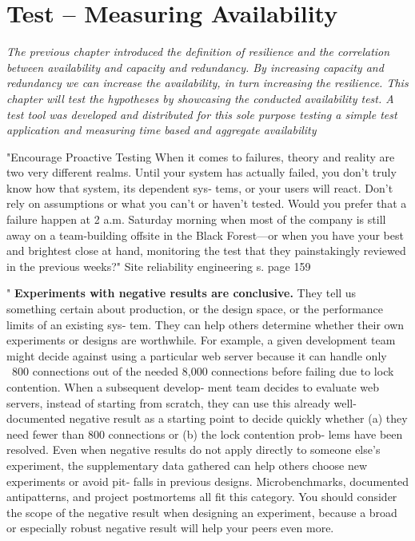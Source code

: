 \chapter{Test -- Measuring Availability}
\label{ch:experiment}

\textit{The previous chapter introduced the definition of resilience and the correlation between availability and capacity and redundancy. By increasing capacity and redundancy we can increase the availability, in turn increasing the resilience. This chapter will test the hypotheses by showcasing the conducted availability test. A test tool was developed and distributed for this sole purpose testing a simple test application and measuring time based and aggregate availability}






"Encourage Proactive Testing
When it comes to failures, theory and reality are two very different realms. Until your system has actually failed, you don’t truly know how that system, its dependent sys‐ tems, or your users will react. Don’t rely on assumptions or what you can’t or haven’t tested. Would you prefer that a failure happen at 2 a.m. Saturday morning when most of the company is still away on a team-building offsite in the Black Forest—or when you have your best and brightest close at hand, monitoring the test that they painstakingly reviewed in the previous weeks?"
Site reliability engineering s. page 159

"
\textbf{Experiments with negative results are conclusive. }They tell us something certain about production, or the design space, or the performance limits of an existing sys‐ tem. They can help others determine whether their own experiments or designs are worthwhile. For example, a given development team might decide against using a particular web server because it can handle only ~800 connections out of the needed 8,000 connections before failing due to lock contention. When a subsequent develop‐ ment team decides to evaluate web servers, instead of starting from scratch, they can use this already well-documented negative result as a starting point to decide quickly whether (a) they need fewer than 800 connections or (b) the lock contention prob‐ lems have been resolved.
Even when negative results do not apply directly to someone else’s experiment, the supplementary data gathered can help others choose new experiments or avoid pit‐ falls in previous designs. Microbenchmarks, documented antipatterns, and project postmortems all fit this category. You should consider the scope of the negative result when designing an experiment, because a broad or especially robust negative result will help your peers even more.


